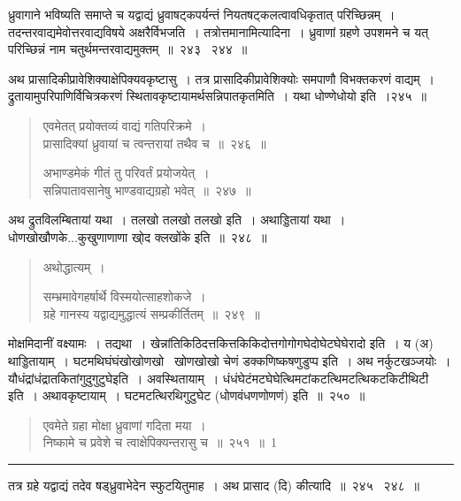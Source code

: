 \documentclass[11pt, openany]{book}
\begin{document}
ध्रुवागाने भविष्यति समाप्ते च यद्वाद्यं ध्रुवाषट्कपर्यन्तं नियतषट्कलत्वावधिकृतात् परिच्छिन्नम्~। तदन्तरवाद्यमेवोत्तरवाद्यविषये अक्षरैर्विभजति~। तत्रोत्तमानामित्यादिना~। ध्रुवाणां ग्रहणे उपशमने च यत् परिच्छिन्नं नाम चतुर्थमन्तरवाद्यमुक्तम्~॥~२४३ \textendash\ २४४~॥

\newpage

{\qt अथ प्रासादिकीप्रावेशिक्याक्षेपिक्यवकृष्टासु~। तत्र प्रासादिकीप्रावेशिक्योः समपाणौ विभक्तकरणं वाद्यम्~। द्रुतायामुपरिपाणिर्विचित्रकरणं स्थितावकृष्टायामर्थसन्निपातकृतमिति~। यथा धोण्णेधोयो इति~।२४५~॥}

\begin{quote}
{\na  एवमेतत् प्रयोक्तव्यं वाद्यं गतिपरिक्रमे~।\\
 प्रासादिक्यां ध्रुवायां च त्वन्तरायां तथैव च~॥~२४६~॥

 अभाण्डमेकं गीतं तु परिवर्तं प्रयोजयेत्~।\\
 सन्निपातावसानेषु भाण्डवाद्यग्रहो भवेत्~॥~२४७~॥}
\end{quote}

{\qt  अथ द्रुतविलम्बितायां यथा~। तलखो तलखो तलखो इति~। अथाड्डितायां यथा~। धोणखोखौणके...कुखुणाणाणा खो्द क्लखोंके इति~॥~२४८~॥}

\begin{quote}
{\qt अथोद्धात्यम्~।}

{\na सम्भ्रमावेगहर्षार्थे विस्मयोत्साहशोकजे~।\\
 ग्रहे गानस्य यद्वाद्यमुद्धात्यं सम्प्रकीर्तितम्~॥~२४९~॥}
\end{quote}

{\qt मोक्षमिदानीं वक्ष्यामः~। तद्यथा~। खेन्नांतिकिठिदत्तकित्तकिकिदोत्तगोगोगघेदोघेटघेघेरादो इति~। य (अ) थाड्डितायाम्~। घटमथिघंघंखोखोणखो \textendash\ खोणखोखो चेणं डक्कणिष्कषणुडुप्प इति~। अथ नर्कुटखञ्जयोः~। यौधंद्रांधंद्रातकितांगुदुगुटुघेइति~। अवस्थितायाम्~। धंधंघेटंमटघेघेत्थिमटांकटत्थिमटत्थिकटकिटीथिटी इति~। अथावकृष्टायाम्~। घटमटत्थिरथिगुटुघेट  (धोणवंधणणोणणं) इति~॥~२५०~॥}

\begin{quote}
{\na  एवमेते ग्रहा मोक्षा ध्रुवाणां गदिता मया~।\\
 निष्कामे च प्रवेशे च त्वाक्षेपिक्यन्तरासु च~॥~२५१~॥~1}
\end{quote}

\hrule

\vspace{2mm}
तत्र ग्रहे यद्वाद्यं तदेव षड्ध्रुवाभेदेन स्फुटयितुमाह~। अथ प्रासाद (दि) कीत्यादि~॥~२४५ \textendash\ २४८~॥\\
\end{document}
